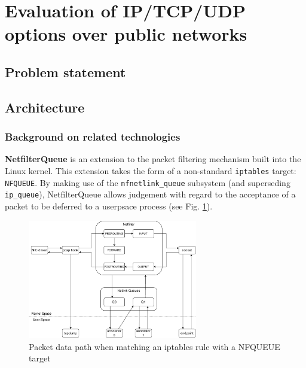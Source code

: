 \section{Evaluation of IP/TCP/UDP options over public networks}
\label{extend:ops}

\subsection{Problem statement}
\label{extend:ops:intro}


\subsection{Architecture}
\label{extend:ops:architecture}

\subsubsection{Background on related technologies}
\label{extend:ops:architecture:background}

\textbf{NetfilterQueue} is an extension to the packet filtering mechanism built into the Linux kernel. This extension takes the form of a non-standard \texttt{iptables} target: \texttt{NFQUEUE}. By making use of the \texttt{nfnetlink\_queue} subsystem (and superseding \texttt{ip\_queue}), NetfilterQueue allows judgement with regard to the acceptance of a packet to be deferred to a userpsace process (see Fig. \ref{extend:ops:fig:nfq}).

\begin{figure}[htb]
    \begin{center}
        \includegraphics[width=0.66\textwidth,keepaspectratio]{figures/netfilter_queue.pdf}
    \end{center}
    \caption{Packet data path when matching an iptables rule with a NFQUEUE target}
    \label{extend:ops:fig:nfq}
\end{figure}

